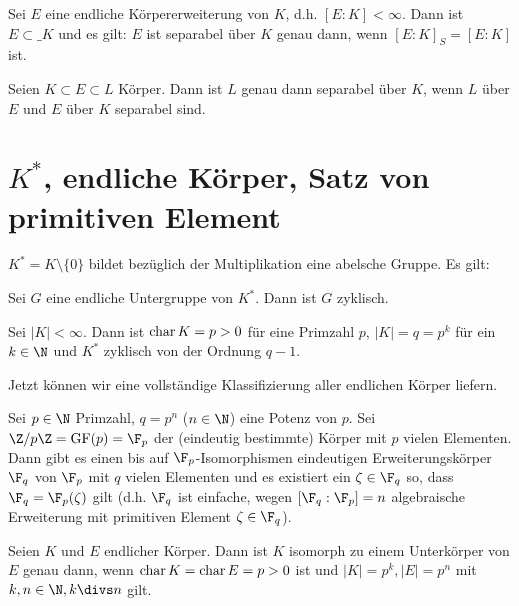 \begin{st} \label{19.1-19}
	Sei $E$ eine endliche Körpererweiterung von $K$, d.h. $[E : K] < \infty$.
	Dann ist $E \subset \_K$ und es gilt:
	$E$ ist separabel über $K$ genau dann, wenn $[E : K]_S = [E : K]$ ist.
\end{st}

\begin{st} \label{19.1-20}
	Seien $K \subset E \subset L$ Körper.
	Dann ist $L$ genau dann separabel über $K$, wenn $L$ über $E$ und $E$ über $K$ separabel sind.
\end{st}


\section{\texorpdfstring{$K^*$}{K*}, endliche Körper, Satz von primitiven Element}

$K^* = K \setminus \{0\}$ bildet bezüglich der Multiplikation eine abelsche Gruppe.
Es gilt:

\begin{st} \label{19.2-1}
	Sei $G$ eine endliche Untergruppe von $K^*$.
	Dann ist $G$ zyklisch.
\end{st}

\begin{st} \label{19.2-2}
	Sei $|K| < \infty$.
	Dann ist $\operatorname{char} K = p > 0$ für eine Primzahl $p$, $|K| = q = p^k$ für ein $k \in \N$ und $K^*$ zyklisch von der Ordnung $q - 1$.
\end{st}

Jetzt können wir eine vollständige Klassifizierung aller endlichen Körper liefern.

\begin{st} \label{19.2-3}
	Sei $p \in \N$ Primzahl, $q = p^n$ ($n \in \N$) eine Potenz von $p$.
	Sei $\Z / p\Z = \GF(p) = \F_p$ der (eindeutig bestimmte) Körper mit $p$ vielen Elementen.
	Dann gibt es einen bis auf $\F_p$-Isomorphismen eindeutigen Erweiterungskörper $\F_q$ von $\F_p$ mit $q$ vielen Elementen und es existiert ein $\zeta \in \F_q$ so, dass $\F_q = \F_p(\zeta)$ gilt (d.h. $\F_q$ ist einfache, wegen $[\F_q : \F_p] = n$ algebraische Erweiterung mit primitiven Element $\zeta \in \F_q$).
\end{st}

\begin{kor} \label{19.2-4}
	Seien $K$ und $E$ endlicher Körper.
	Dann ist $K$ isomorph zu einem Unterkörper von $E$ genau dann, wenn $\operatorname{char} K = \operatorname{char} E = p > 0$ ist und $|K| = p^k, |E| = p^n$ mit $k, n \in \N, k \divs n$ gilt.
\end{kor}

